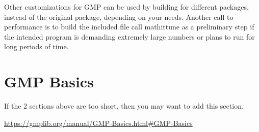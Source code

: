 Other customizations for GMP can be used by building for different packages, instead of the original package, depending on your needs.
Another call to performance is to build the included file call mathit{tune} as a preliminary step if the intended program is demanding extremely large numbers or plans to run for long periods of time.


\section{GMP Basics}

If the 2 sections above are too short,
then you may want to add this section.

\url{https://gmplib.org/manual/GMP-Basics.html#GMP-Basics}
